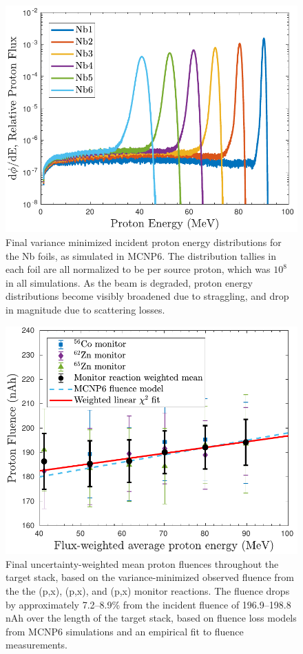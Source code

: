 \begin{figure}
 \centering
 \includegraphics[width=0.5\linewidth]{./figures/Nb_ptallies.pdf}
 \caption{Final variance minimized incident proton energy distributions for the Nb foils, as simulated in MCNP6. The distribution tallies in each foil are all normalized to be per source proton, which was $10^8$ in all simulations. As the beam is degraded, proton energy distributions become visibly broadened due to straggling, and drop in magnitude due to scattering losses.}
 \label{fig:Nb_ptallies}
\end{figure}

\begin{figure}
 \centering
 \includegraphics[width=0.5\linewidth]{./figures/fluence_plot.pdf}
 \caption{Final uncertainty-weighted mean proton fluences throughout the target stack, based on the variance-minimized observed fluence from the the  (p,x), (p,x), and (p,x) monitor reactions. 
  The fluence  drops by approximately 7.2--8.9\% from the incident fluence of 196.9--198.8 nAh over the length of the target stack, based on fluence loss models from MCNP6 simulations and an empirical fit to  fluence measurements.}  
 \label{fig:fluence_plot}
\end{figure}







